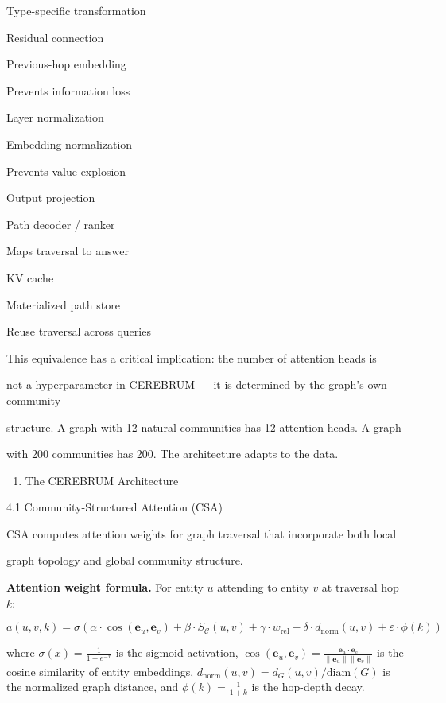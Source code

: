 \documentclass[10pt,journal,compsoc]{IEEEtran}
\begin{document}
Type-specific trans\-formation

Residual connection

Previous-hop embedding

Prevents information loss

Layer norma\-lization

Embedding norma\-lization

Prevents value explosion

Output projection

Path decoder / ranker

Maps traversal to answer

KV cache

Materi\-alized path store

Reuse traversal across queries

This equivalence has a critical implication: \textit{}the number of attention heads is

not a hyper\-parameter in CEREBRUM — it is determined by the graph's own community

structure.\textit{} A graph with 12 natural communities has 12 attention heads. A graph

with 200 communities has 200. The archi\-tecture adapts to the data.

\begin{enumerate}
\item The CEREBRUM Archit\-ecture

\end{enumerate}
4.1 Community-Structured Attention (CSA)

CSA computes attention weights for graph traversal that incorporate both local

graph topology and global community structure.

\textbf{Attention weight formula.} For entity $u$ attending to entity $v$ at traversal hop $k$:

\begin{equation}
\boxed{a(u,v,k) = \sigma\!\left(\alpha \cdot \cos\!\left(\mathbf{e}_u, \mathbf{e}_v\right) + \beta \cdot S_{\mathcal{C}}(u,v) + \gamma \cdot w_{\mathrm{rel}} - \delta \cdot d_{\mathrm{norm}}(u,v) + \varepsilon \cdot \phi(k)\right)}
\end{equation}

where $\sigma(x) = \frac{1}{1 + e^{-x}}$ is the sigmoid activation, $\cos(\mathbf{e}_u, \mathbf{e}_v) = \frac{\mathbf{e}_u \cdot \mathbf{e}_v}{\|\mathbf{e}_u\|\|\mathbf{e}_v\|}$ is the cosine similarity of entity embeddings, $d_{\mathrm{norm}}(u,v) = d_G(u,v) / \mathrm{diam}(G)$ is the normalized graph distance, and $\phi(k) = \frac{1}{1+k}$ is the hop-depth decay.
\end{document}
